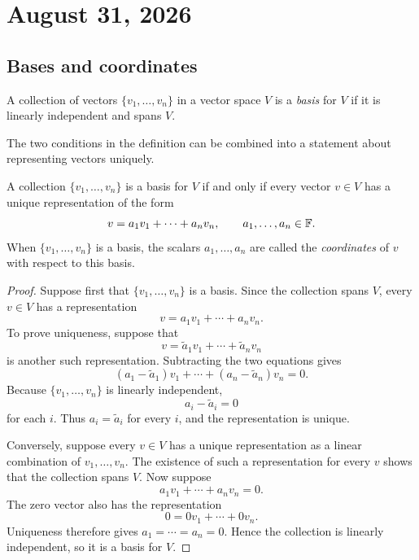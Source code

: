\section{August 31, 2026}

\subsection{Bases and coordinates}

\begin{definition}[Basis]
  A collection of vectors $\{v_1,\ldots,v_n\}$ in a vector space $V$ is
  a \emph{basis} for $V$ if it is linearly independent and spans $V$.
\end{definition}

The two conditions in the definition can be combined into a statement
about representing vectors uniquely.

\begin{proposition}
  A collection $\{v_1,\ldots,v_n\}$ is a basis for $V$ if and only if
  every vector $v\in V$ has a unique representation of the form
  \[
    v=a_1v_1+\cdots+a_nv_n,
    \qquad a_1,\ldots,a_n\in\mathbb{F}.
  \]
  When $\{v_1,\ldots,v_n\}$ is a basis, the scalars
  $a_1,\ldots,a_n$ are called the \emph{coordinates} of $v$ with respect
  to this basis.
\end{proposition}

\begin{proof}
  Suppose first that $\{v_1,\ldots,v_n\}$ is a basis. Since the
  collection spans $V$, every $v\in V$ has a representation
  \[
    v=a_1v_1+\cdots+a_nv_n.
  \]
  To prove uniqueness, suppose that
  \[
    v=\widetilde a_1v_1+\cdots+\widetilde a_nv_n
  \]
  is another such representation. Subtracting the two equations gives
  \[
    (a_1-\widetilde a_1)v_1+\cdots
      +(a_n-\widetilde a_n)v_n=0.
  \]
  Because $\{v_1,\ldots,v_n\}$ is linearly independent,
  \[
    a_i-\widetilde a_i=0
  \]
  for each $i$. Thus $a_i=\widetilde a_i$ for every $i$, and the
  representation is unique.

  Conversely, suppose every $v\in V$ has a unique representation as a
  linear combination of $v_1,\ldots,v_n$. The existence of such a
  representation for every $v$ shows that the collection spans $V$.
  Now suppose
  \[
    a_1v_1+\cdots+a_nv_n=0.
  \]
  The zero vector also has the representation
  \[
    0=0v_1+\cdots+0v_n.
  \]
  Uniqueness therefore gives $a_1=\cdots=a_n=0$. Hence the collection is
  linearly independent, so it is a basis for $V$.
\end{proof}

